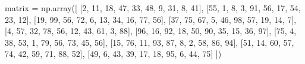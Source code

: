 \documentclass[
  letterpaper,
  DIV=11,
  numbers=noendperiod]{scrreprt}
\newenvironment{Shaded}{\begin{snugshade}}{\end{snugshade}}
\newcommand{\DecValTok}[1]{\textcolor[rgb]{0.68,0.00,0.00}{#1}}
\newcommand{\NormalTok}[1]{\textcolor[rgb]{0.00,0.23,0.31}{#1}}
\newcommand{\OperatorTok}[1]{\textcolor[rgb]{0.37,0.37,0.37}{#1}}
\begin{document}
\begin{tcolorbox}
\begin{Shaded}
\begin{Highlighting}[]
\NormalTok{matrix }\OperatorTok{=}\NormalTok{ np.array([}
\NormalTok{    [}\DecValTok{2}\NormalTok{, }\DecValTok{11}\NormalTok{, }\DecValTok{18}\NormalTok{, }\DecValTok{47}\NormalTok{, }\DecValTok{33}\NormalTok{, }\DecValTok{48}\NormalTok{, }\DecValTok{9}\NormalTok{, }\DecValTok{31}\NormalTok{, }\DecValTok{8}\NormalTok{, }\DecValTok{41}\NormalTok{],}
\NormalTok{    [}\DecValTok{55}\NormalTok{, }\DecValTok{1}\NormalTok{, }\DecValTok{8}\NormalTok{, }\DecValTok{3}\NormalTok{, }\DecValTok{91}\NormalTok{, }\DecValTok{56}\NormalTok{, }\DecValTok{17}\NormalTok{, }\DecValTok{54}\NormalTok{, }\DecValTok{23}\NormalTok{, }\DecValTok{12}\NormalTok{],}
\NormalTok{    [}\DecValTok{19}\NormalTok{, }\DecValTok{99}\NormalTok{, }\DecValTok{56}\NormalTok{, }\DecValTok{72}\NormalTok{, }\DecValTok{6}\NormalTok{, }\DecValTok{13}\NormalTok{, }\DecValTok{34}\NormalTok{, }\DecValTok{16}\NormalTok{, }\DecValTok{77}\NormalTok{, }\DecValTok{56}\NormalTok{],}
\NormalTok{    [}\DecValTok{37}\NormalTok{, }\DecValTok{75}\NormalTok{, }\DecValTok{67}\NormalTok{, }\DecValTok{5}\NormalTok{, }\DecValTok{46}\NormalTok{, }\DecValTok{98}\NormalTok{, }\DecValTok{57}\NormalTok{, }\DecValTok{19}\NormalTok{, }\DecValTok{14}\NormalTok{, }\DecValTok{7}\NormalTok{],}
\NormalTok{    [}\DecValTok{4}\NormalTok{, }\DecValTok{57}\NormalTok{, }\DecValTok{32}\NormalTok{, }\DecValTok{78}\NormalTok{, }\DecValTok{56}\NormalTok{, }\DecValTok{12}\NormalTok{, }\DecValTok{43}\NormalTok{, }\DecValTok{61}\NormalTok{, }\DecValTok{3}\NormalTok{, }\DecValTok{88}\NormalTok{],}
\NormalTok{    [}\DecValTok{96}\NormalTok{, }\DecValTok{16}\NormalTok{, }\DecValTok{92}\NormalTok{, }\DecValTok{18}\NormalTok{, }\DecValTok{50}\NormalTok{, }\DecValTok{90}\NormalTok{, }\DecValTok{35}\NormalTok{, }\DecValTok{15}\NormalTok{, }\DecValTok{36}\NormalTok{, }\DecValTok{97}\NormalTok{],}
\NormalTok{    [}\DecValTok{75}\NormalTok{, }\DecValTok{4}\NormalTok{, }\DecValTok{38}\NormalTok{, }\DecValTok{53}\NormalTok{, }\DecValTok{1}\NormalTok{, }\DecValTok{79}\NormalTok{, }\DecValTok{56}\NormalTok{, }\DecValTok{73}\NormalTok{, }\DecValTok{45}\NormalTok{, }\DecValTok{56}\NormalTok{],}
\NormalTok{    [}\DecValTok{15}\NormalTok{, }\DecValTok{76}\NormalTok{, }\DecValTok{11}\NormalTok{, }\DecValTok{93}\NormalTok{, }\DecValTok{87}\NormalTok{, }\DecValTok{8}\NormalTok{, }\DecValTok{2}\NormalTok{, }\DecValTok{58}\NormalTok{, }\DecValTok{86}\NormalTok{, }\DecValTok{94}\NormalTok{],}
\NormalTok{    [}\DecValTok{51}\NormalTok{, }\DecValTok{14}\NormalTok{, }\DecValTok{60}\NormalTok{, }\DecValTok{57}\NormalTok{, }\DecValTok{74}\NormalTok{, }\DecValTok{42}\NormalTok{, }\DecValTok{59}\NormalTok{, }\DecValTok{71}\NormalTok{, }\DecValTok{88}\NormalTok{, }\DecValTok{52}\NormalTok{],}
\NormalTok{    [}\DecValTok{49}\NormalTok{, }\DecValTok{6}\NormalTok{, }\DecValTok{43}\NormalTok{, }\DecValTok{39}\NormalTok{, }\DecValTok{17}\NormalTok{, }\DecValTok{18}\NormalTok{, }\DecValTok{95}\NormalTok{, }\DecValTok{6}\NormalTok{, }\DecValTok{44}\NormalTok{, }\DecValTok{75}\NormalTok{]}
\NormalTok{])}
\end{Highlighting}
\end{Shaded}


\end{tcolorbox}
\end{document}

